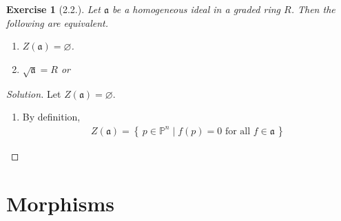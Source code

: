 \documentclass[11pt]{book}
\newtheorem{exercise}{Exercise}[section]
\newenvironment{solution}
  {\renewcommand{\qedsymbol}{}\begin{proof}[Solution]}
  {\end{proof}}
\theoremstyle{definition}
\numberwithin{equation}{section}
\newcommand{\makeset}[2]{\left\{\, #1 \mathrel{\mid} #2 \,\right\}}
\begin{document}
\begin{exercise}[2.2.]
    Let \(\mathfrak{a}\) be a homogeneous ideal in a graded ring \(R\). Then the following are equivalent.
    \begin{enumerate}
        \item \(Z(\mathfrak{a}) = \varnothing\).
        \item \(\sqrt{\mathfrak{a}} = R\) or
    \end{enumerate}
\end{exercise}
\begin{solution}
    Let \(Z(\mathfrak{a}) = \varnothing\).
    \begin{enumerate}
        \item By definition,
        \begin{align*}
            Z(\mathfrak{a}) = \makeset{p \in \mathbb{P}^n}{f(p) = 0 \text{ for all } f \in \mathfrak{a}}
        \end{align*}
    \end{enumerate}
\end{solution}


\chapter{Morphisms}
\end{document}
